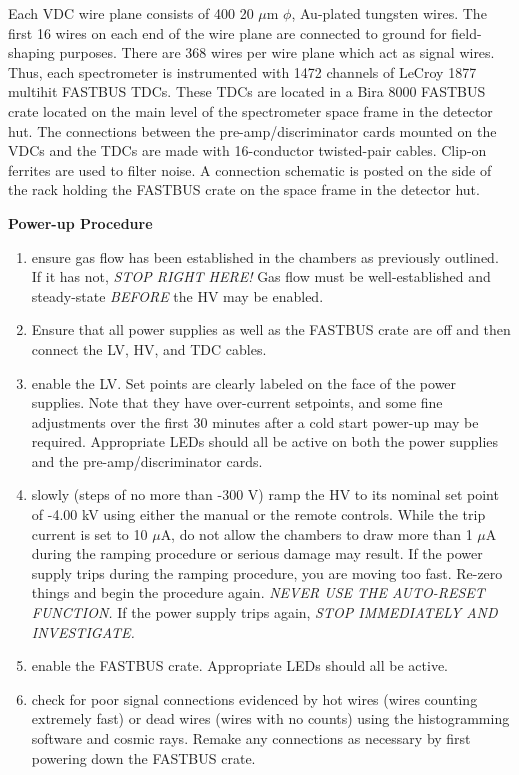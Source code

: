 \documentclass[12pt]{article}
\begin{document}
Each VDC wire plane consists of 400 20 $\mu$m $\phi$, Au-plated
tungsten wires.  The first 16 wires on each end of the wire plane
are connected to ground for field-shaping purposes.  There are
368 wires per wire plane which act as signal wires.  Thus, each
spectrometer is instrumented with 1472 channels of LeCroy 1877
multihit FASTBUS TDCs.  These TDCs are located in a Bira 8000 FASTBUS
crate located on the main level of the spectrometer space frame in
the detector hut.  The connections between the pre-amp/discriminator
cards mounted on the VDCs and the TDCs are made with 16-conductor
twisted-pair cables.  Clip-on ferrites are used to filter noise.
A connection schematic is posted on the side of the rack holding
the FASTBUS crate on the space frame in the detector hut.

\begin{center}
{\bf Power-up Procedure}
\end{center}

\begin{enumerate}
\item {ensure gas flow has been established in the chambers as
previously outlined.  If it has not, {\it STOP RIGHT
HERE!}  Gas flow must be well-established and steady-state
{\it BEFORE} the HV may be enabled.}
\item {Ensure that all power supplies as well as the FASTBUS crate
are off and then connect the LV, HV, and TDC cables.}
\item {enable the LV.  Set points are clearly labeled on the face of
the power supplies.  Note that they have over-current setpoints, and
some fine adjustments over the first 30 minutes after a cold start
power-up may be required.  Appropriate LEDs should all be active on
both the power supplies and the pre-amp/discriminator cards.}
\item {slowly (steps of no more than -300 V) ramp the HV to its
nominal set point of -4.00 kV using either the manual or the remote
controls.   While the trip current is set to 10 $\mu$A, do not allow
the chambers to draw more than 1 $\mu$A during the ramping procedure
or serious damage may result.  If the power supply trips during the
ramping procedure, you are moving too fast.  Re-zero things and begin
the procedure again.  {\it NEVER USE THE AUTO-RESET FUNCTION.}}  If
the power supply trips again, {\it STOP IMMEDIATELY AND INVESTIGATE.}
\item {enable the FASTBUS crate.  Appropriate LEDs should all be
active.}
\item {check for poor signal connections evidenced by hot wires (wires
counting extremely fast) or dead wires (wires with no counts) using
the histogramming software and cosmic rays.  Remake any connections as
necessary by first powering down the FASTBUS crate.}
\end{enumerate}
\end{document}
